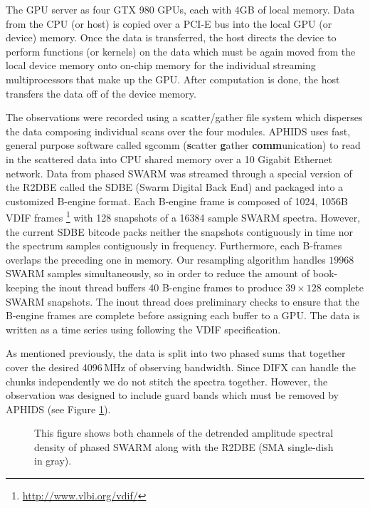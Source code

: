 \documentclass[11pt,preprint]{aastex}
\begin{document}
The GPU server as four GTX 980 GPUs, each with 4GB of local memory.  Data from the CPU (or host) is copied over 
a PCI-E bus into the local GPU (or device) memory.  Once the data is transferred, the host directs the device
to perform functions (or kernels) on the data which must be again moved from the local device memory onto 
on-chip memory for the individual streaming multiprocessors that make up the GPU.  After computation is done, 
the host transfers the data off of the device memory.

The observations were recorded using a scatter/gather file system which disperses the 
data composing individual scans over the four modules.  APHIDS uses fast, general purpose software called 
sgcomm (\textbf{s}catter \textbf{g}ather \textbf{comm}unication) to read in 
the scattered data into CPU shared memory over a 10 Gigabit Ethernet network.  Data from phased SWARM was 
streamed through a special version of the R2DBE called the SDBE (Swarm Digital Back End) and packaged into
a customized B-engine format.  Each B-engine frame is composed of 1024, 1056B VDIF frames 
\footnote{\url{http://www.vlbi.org/vdif/}} with 128 snapshots of a 
16384 sample SWARM spectra.  However, the current SDBE bitcode packs
neither the snapshots contiguously in time nor the spectrum samples contiguously in frequency.  Furthermore, 
each B-frames overlaps the preceding one in memory.  Our resampling algorithm handles $19968$\,SWARM samples
simultaneously, so in order to reduce the amount of book-keeping the inout thread buffers 40 B-engine frames to 
produce $39 \times 128$ complete SWARM snapshots.  The inout thread does preliminary checks to ensure that the 
B-engine frames are complete before assigning each buffer to a GPU.  The data is written as a time series using 
following the VDIF specification.

As mentioned previously, the data is split into two phased sums that together cover the desired 4096\,MHz of 
observing bandwidth.  Since DIFX can handle the chunks independently we do not stitch the spectra together. 
However, the observation was designed to include guard bands which must be removed by APHIDS 
(see Figure \ref{fig:swarm_amp_spec}).

\begin{figure}[t!]
\caption{This figure shows both channels of the detrended amplitude spectral density of phased SWARM along with 
the R2DBE (SMA single-dish in gray).}
\label{fig:swarm_amp_spec}
\end{figure}
\end{document}
